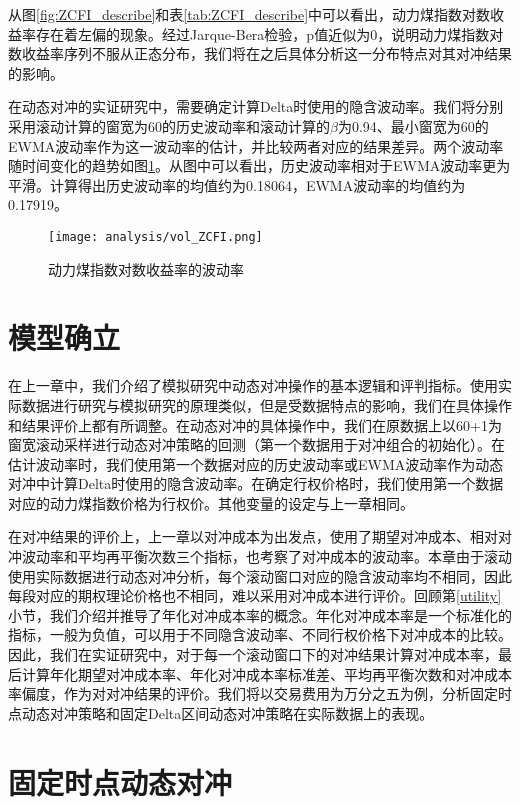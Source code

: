 从图\ref{fig:ZCFI_describe}和表\ref{tab:ZCFI_describe}中可以看出，动力煤指数对数收益率存在着左偏的现象。经过Jarque-Bera检验，p值近似为0，说明动力煤指数对数收益率序列不服从正态分布，我们将在之后具体分析这一分布特点对其对冲结果的影响。

在动态对冲的实证研究中，需要确定计算Delta时使用的隐含波动率。我们将分别采用滚动计算的窗宽为60的历史波动率和滚动计算的$\beta$为0.94、最小窗宽为60的EWMA波动率作为这一波动率的估计，并比较两者对应的结果差异。两个波动率随时间变化的趋势如图\ref{fig:vol_ZCFI}。从图中可以看出，历史波动率相对于EWMA波动率更为平滑。计算得出历史波动率的均值约为0.18064，EWMA波动率的均值约为0.17919。

\begin{figure}[htb]
  \centering
  \texttt{[image: analysis/vol\_ZCFI.png]}
  \caption[这里将出现在插图索引中]
    {动力煤指数对数收益率的波动率}
  \label{fig:vol_ZCFI}
\end{figure}

\section{模型确立}

在上一章中，我们介绍了模拟研究中动态对冲操作的基本逻辑和评判指标。使用实际数据进行研究与模拟研究的原理类似，但是受数据特点的影响，我们在具体操作和结果评价上都有所调整。在动态对冲的具体操作中，我们在原数据上以60+1为窗宽滚动采样进行动态对冲策略的回测（第一个数据用于对冲组合的初始化）。在估计波动率时，我们使用第一个数据对应的历史波动率或EWMA波动率作为动态对冲中计算Delta时使用的隐含波动率。在确定行权价格时，我们使用第一个数据对应的动力煤指数价格为行权价。其他变量的设定与上一章相同。

在对冲结果的评价上，上一章以对冲成本为出发点，使用了期望对冲成本、相对对冲波动率和平均再平衡次数三个指标，也考察了对冲成本的波动率。本章由于滚动使用实际数据进行动态对冲分析，每个滚动窗口对应的隐含波动率均不相同，因此每段对应的期权理论价格也不相同，难以采用对冲成本进行评价。回顾第\ref{utility}小节，我们介绍并推导了年化对冲成本率的概念。年化对冲成本率是一个标准化的指标，一般为负值，可以用于不同隐含波动率、不同行权价格下对冲成本的比较。因此，我们在实证研究中，对于每一个滚动窗口下的对冲结果计算对冲成本率，最后计算年化期望对冲成本率、年化对冲成本率标准差、平均再平衡次数和对冲成本率偏度，作为对对冲结果的评价。我们将以交易费用为万分之五为例，分析固定时点动态对冲策略和固定Delta区间动态对冲策略在实际数据上的表现。

\section{固定时点动态对冲}

